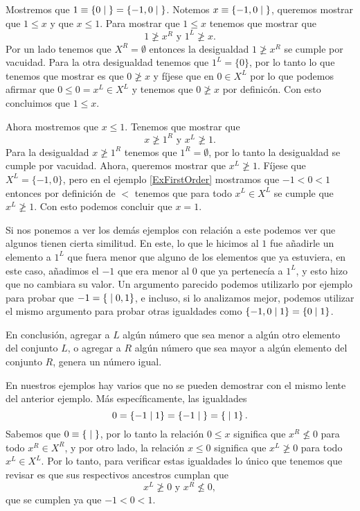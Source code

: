     \begin{example} \label{ExErasePar}
        Mostremos que $1\equiv \left\{0\;\middle|\; \right\} = \left\{-1, 0\;\middle|\; \right\}$. Notemos $x\equiv \left\{-1, 0\;\middle|\; \right\}$, queremos mostrar que $1 \le x$ y que $x \le 1$. Para mostrar que $1\le x$ tenemos que mostrar que
        \[
            1 \not\ge x^R \text{ y } 1^L \not\ge x.
        \]
        Por un lado tenemos que $X^R = \emptyset$ entonces la desigualdad $1 \not\ge x^R$ se cumple por vacuidad. Para la otra desigualdad tenemos que $1^L=\{0\}$, por lo tanto lo que tenemos que mostrar es que $0 \not\ge x$ y f\'ijese que en $0\in X^L$ por lo que podemos afirmar que $0\le 0 = x^L\in X^L$ y tenemos que $0 \not\ge x$ por definic\'on. Con esto concluimos que $1\le x$.

        Ahora mostremos que $x\le 1$. Tenemos que mostrar que
        \[
            x \not\ge 1^R \text{ y } x^L \not\ge 1.
        \]
        Para la desigualdad $x \not\ge 1^R$ tenemos que $1^R = \emptyset$, por lo tanto la desigualdad se cumple por vacuidad. Ahora, queremos mostrar que $x^L \not\ge 1$. F\'ijese que $X^L = \{-1, 0\}$, pero en el ejemplo \ref{ExFirstOrder} mostramos que $-1 < 0 < 1$ entonces por definici\'on de $<$ tenemos que para todo $x^L\in X^L$ se cumple que $x^L \not\ge 1$. Con esto podemos concluir que $x = 1$.
        
        Si nos ponemos a ver los dem\'as ejemplos con relaci\'on a este podemos ver que algunos tienen cierta similitud. En este, lo que le hicimos al $1$ fue añadirle un elemento a $1^L$ que fuera menor que alguno de los elementos que ya estuviera, en este caso, añadimos el $-1$ que era menor al $0$ que ya pertenec\'ia a $1^L$, y esto hizo que no cambiara su valor. Un argumento parecido podemos utilizarlo por ejemplo para probar que $-1 = \left\{\;\middle|\; 0,1\right\}$, e incluso, si lo analizamos mejor, podemos utilizar el mismo argumento para probar otras igualdades como $\left\{-1,0\;\middle|\; 1\right\} = \left\{0\;\middle|\; 1\right\}$.

        En conclusi\'on, agregar a $L$ alg\'un n\'umero que sea menor a alg\'un otro elemento del conjunto $L$, o agregar a $R$ alg\'un n\'umero que sea mayor a alg\'un elemento del conjunto $R$, genera un n\'umero igual.
    \end{example}

    \begin{example} \label{Ex_equaltozero}
        En nuestros ejemplos hay varios que no se pueden demostrar con el mismo lente del anterior ejemplo. M\'as espec\'ificamente, las igualdades
        \[
            0 = \left\{-1\;\middle|\; 1\right\} = \left\{-1\;\middle|\; \right\} = \left\{\;\middle|\; 1\right\}.
        \]
        Sabemos que $0 \equiv \left\{\;\middle|\; \right\}$, por lo tanto la relaci\'on $0 \le x$ significa que $x^R \not\le 0$ para todo $x^R\in X^R$, y por otro lado, la relaci\'on $x\le 0$ significa que $x^L \not\ge 0$ para todo $x^L\in X^L$. Por lo tanto, para verificar estas igualdades lo \'unico que tenemos que revisar es que sus respectivos ancestros cumplan que
        \[
            x^L \not\ge 0\text{ y } x^R \not\le 0,
        \]
        que se cumplen ya que $-1 < 0 < 1$. 
    \end{example}

